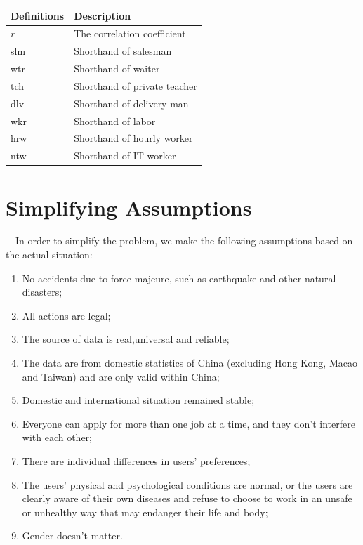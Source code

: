 \documentclass[12pt]{article}
\begin{document}
\begin{table}
    \begin{tabular*}{15cm}{ll}
        \hline
        Definitions & Description\\
        \hline
        $r$ & The correlation coefficient\\
        slm & Shorthand of salesman\\
        wtr & Shorthand of waiter\\
        tch & Shorthand of private teacher\\
        dlv & Shorthand of delivery man\\
        wkr & Shorthand of labor\\
        hrw & Shorthand of hourly worker\\
        ntw & Shorthand of IT worker\\ 
    \end{tabular*}
\end{table}

\section{Simplifying Assumptions}
~~In order to simplify the problem, we make the following assumptions based on the actual situation:
~~
\begin{enumerate}
    \item No accidents due to force majeure, such as earthquake and other natural disasters;
    \item All actions are legal;
    \item The source of data is real,universal and reliable;
    \item The data are from domestic statistics of China (excluding Hong Kong, Macao and Taiwan) and are only valid within China;
    \item Domestic and international situation remained stable;
    \item Everyone can apply for more than one job at a time, and they don't interfere with each other;
    \item There are individual differences in users' preferences;
    \item The users' physical and psychological conditions are normal, or the users are clearly aware of their own diseases and refuse to choose to work in an unsafe or unhealthy way that may endanger their life and body;
    \item Gender doesn't matter.
\end{enumerate}
\end{document}
